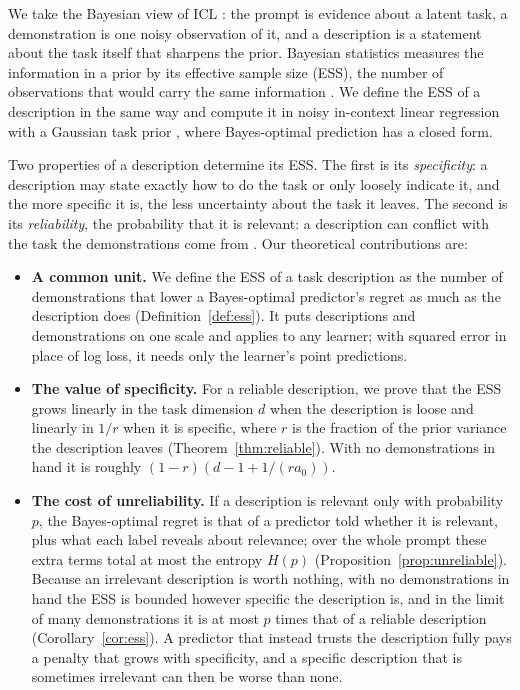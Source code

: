 \documentclass{article}
\begin{document}
We take the Bayesian view of ICL \citep{xie2022}: the prompt is evidence about a latent task, a demonstration is one noisy observation of it, and a description is a statement about the task itself that sharpens the prior. Bayesian statistics measures the information in a prior by its effective sample size (ESS), the number of observations that would carry the same information \citep{morita2008}. We define the ESS of a description in the same way and compute it in noisy in-context linear regression with a Gaussian task prior \citep{garg2022, akyurek2023, raventos2023}, where Bayes-optimal prediction has a closed form.

Two properties of a description determine its ESS. The first is its \emph{specificity}: a description may state exactly how to do the task or only loosely indicate it, and the more specific it is, the less uncertainty about the task it leaves. The second is its \emph{reliability}, the probability that it is relevant: a description can conflict with the task the demonstrations come from \citep{evans2006}. Our theoretical contributions are:
\begin{itemize}
    \item \textbf{A common unit.} We define the ESS of a task description as the number of demonstrations that lower a Bayes-optimal predictor's regret as much as the description does (Definition~\ref{def:ess}). It puts descriptions and demonstrations on one scale and applies to any learner; with squared error in place of log loss, it needs only the learner's point predictions.
    \item \textbf{The value of specificity.} For a reliable description, we prove that the ESS grows linearly in the task dimension $d$ when the description is loose and linearly in $1/r$ when it is specific, where $r$ is the fraction of the prior variance the description leaves (Theorem~\ref{thm:reliable}). With no demonstrations in hand it is roughly $(1-r)(d - 1 + 1/(r a_0))$.
    \item \textbf{The cost of unreliability.} If a description is relevant only with probability $p$, the Bayes-optimal regret is that of a predictor told whether it is relevant, plus what each label reveals about relevance; over the whole prompt these extra terms total at most the entropy $H(p)$ (Proposition~\ref{prop:unreliable}). Because an irrelevant description is worth nothing, with no demonstrations in hand the ESS is bounded however specific the description is, and in the limit of many demonstrations it is at most $p$ times that of a reliable description (Corollary~\ref{cor:ess}). A predictor that instead trusts the description fully pays a penalty that grows with specificity, and a specific description that is sometimes irrelevant can then be worse than none.
\end{itemize}
\end{document}
